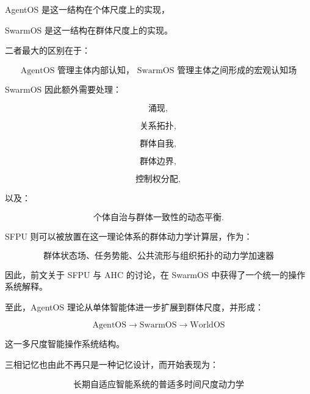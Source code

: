 AgentOS 是这一结构在个体尺度上的实现，

SwarmOS 是这一结构在群体尺度上的实现。

二者最大的区别在于：

\[
\boxed{
\text{AgentOS 管理主体内部认知，
SwarmOS 管理主体之间形成的宏观认知场}
}
\]

SwarmOS 因此额外需要处理：

\[
\text{涌现},
\]

\[
\text{关系拓扑},
\]

\[
\text{群体自我},
\]

\[
\text{群体边界},
\]

\[
\text{控制权分配},
\]

以及：

\[
\text{个体自治与群体一致性的动态平衡}.
\]

SFPU 则可以被放置在这一理论体系的群体动力学计算层，作为：

\[
\boxed{
\text{群体状态场、任务势能、公共流形与组织拓扑的动力学加速器}
}
\]

因此，前文关于 SFPU 与 AHC 的讨论，在 SwarmOS 中获得了一个统一的操作系统解释。

至此，AgentOS 理论从单体智能体进一步扩展到群体尺度，并形成：

\[
\boxed{
\mathrm{AgentOS}
\rightarrow
\mathrm{SwarmOS}
\rightarrow
\mathrm{WorldOS}
}
\]

这一多尺度智能操作系统结构。

三相记忆也由此不再只是一种记忆设计，而开始表现为：

\[
\boxed{
\text{长期自适应智能系统的普适多时间尺度动力学}
}
\]